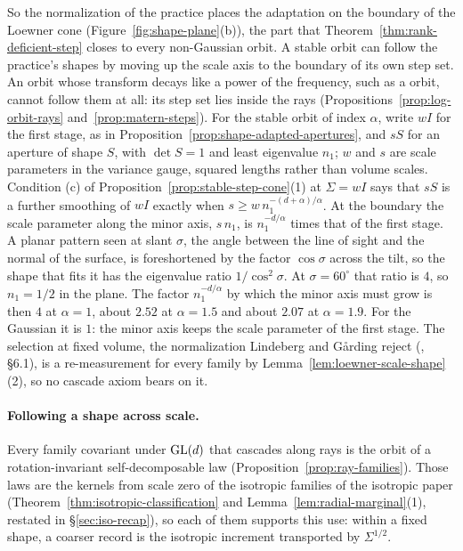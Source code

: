 So the normalization of the practice places the adaptation on the boundary of the Loewner cone
(Figure~\ref{fig:shape-plane}(b)), the part
that Theorem~\ref{thm:rank-deficient-step} closes to every non-Gaussian orbit. A stable orbit can follow
the practice's shapes by moving up the scale axis to the boundary of its own step set. An orbit whose
transform decays like a power of the frequency, such as a \Matern{} orbit, cannot follow them at all:
its step set lies inside the rays (Propositions~\ref{prop:log-orbit-rays}
and~\ref{prop:matern-steps}). For the stable orbit of index $\alpha$, write $wI$ for the first stage,
as in Proposition~\ref{prop:shape-adapted-apertures}, and $sS$ for an aperture of shape $S$, with
$\det S = 1$ and least eigenvalue $n_1$; $w$ and $s$ are scale parameters in the variance gauge,
squared lengths rather than volume scales. Condition (c)
of Proposition~\ref{prop:stable-step-cone}(1) at $\Sigma = wI$ says that $sS$ is a further smoothing
of $wI$ exactly when $s \ge w\,n_1^{-(d+\alpha)/\alpha}$. At the boundary the scale parameter along the minor axis,
$s\,n_1$, is $n_1^{-d/\alpha}$ times that of the first stage. A planar pattern seen at slant $\sigma$, the angle
between the line of sight and the normal of the surface, is foreshortened by the factor $\cos\sigma$
across the tilt, so the shape that fits it has the eigenvalue ratio $1/\cos^2\sigma$. At
$\sigma = 60^\circ$ that ratio is $4$, so $n_1 = 1/2$ in the plane. The factor $n_1^{-d/\alpha}$ by
which the minor axis must grow is then $4$ at $\alpha = 1$, about $2.52$ at $\alpha = 1.5$ and about
$2.07$ at $\alpha = 1.9$. For the Gaussian it is $1$: the minor axis keeps the scale parameter of the first
stage. The selection at fixed volume, the normalization Lindeberg and G\aa{}rding reject
(, \S6.1), is a
re-measurement for every family by Lemma~\ref{lem:loewner-scale-shape}(2), so no cascade axiom bears on
it.

\paragraph{Following a shape across scale.} Every family covariant under $\mathrm{GL}(d)$ that cascades along rays
is the orbit of a rotation-invariant self-decomposable law (Proposition~\ref{prop:ray-families}). Those
laws are the kernels from scale zero of the isotropic families of the isotropic paper
(Theorem~\ref{thm:isotropic-classification} and Lemma~\ref{lem:radial-marginal}(1), restated in
\S\ref{sec:iso-recap}), so each of them supports this use: within a fixed shape, a coarser record is the
isotropic increment transported by $\Sigma^{1/2}$.


